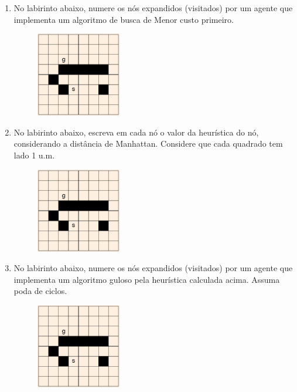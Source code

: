 \documentclass{article}
\begin{document}
\begin{enumerate}
\begin{enumerate}
            \item No labirinto abaixo, numere os nós expandidos (visitados) por um agente que implementa um algoritmo de busca de Menor custo primeiro.
            \begin{figure}[!ht]
                \centering
                \includegraphics[width=0.35\textwidth]{grid.png}
            \end{figure}
        
            \item No labirinto abaixo, escreva em cada nó o valor da heurística do nó, considerando a distância de Manhattan. Considere que cada quadrado tem lado 1 u.m.
            \begin{figure}[!ht]
                \centering
                \includegraphics[width=0.35\textwidth]{grid.png}
            \end{figure}
            
            \item No labirinto abaixo, numere os nós expandidos (visitados) por um agente que implementa um algoritmo guloso pela heurística calculada acima. Assuma poda de ciclos.
            \begin{figure}[!ht]
                \centering
                \includegraphics[width=0.35\textwidth]{grid.png}
            \end{figure}
            

\end{enumerate}
\end{enumerate}
\end{document}
